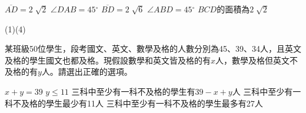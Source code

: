 \begin{QUESTIONS}
\begin{QUESTION}
\begin{QBODY}
        \begin{QOPS}
        \QOP $\overline{AD}=2\sqrt[{}]{2}$
        \QOP $\angle DAB=45{}^\circ $
        \QOP $\overline{BD}=2\sqrt[{}]{6}$
        \QOP $\angle ABD=45{}^\circ $
        \QOP $BCD$的面積為$2\sqrt[{}]{2}$
        \end{QOPS}
    \end{QBODY}
    \begin{QFROMS}
    \end{QFROMS}
    \begin{QTAGS}
    \end{QTAGS}
    \begin{QANS}
        (1)(4)
    \end{QANS}
    \begin{QSOL}
    \end{QSOL}
    \begin{QEMPTYSPACE}
    \end{QEMPTYSPACE}
\end{QUESTION}
\begin{QUESTION}
    \begin{QBODY}
        某班級50位學生，段考國文、英文、數學及格的人數分別為45、39、34人，且英文及格的學生國文也都及格。現假設數學和英文皆及格的有$x$人，數學及格但英文不及格的有$y$人。請選出正確的選項。
        \begin{QOPS}
            \QOP $x+y=39$
            \QOP $y\le 11$
            \QOP 三科中至少有一科不及格的學生有$39-x+y$人
            \QOP 三科中至少有一科不及格的學生最少有11人
            \QOP 三科中至少有一科不及格的學生最多有27人
        \end{QOPS}
    \end{QBODY}
    \begin{QFROMS}
    \end{QFROMS}

\end{QUESTION}
\end{QUESTIONS}
